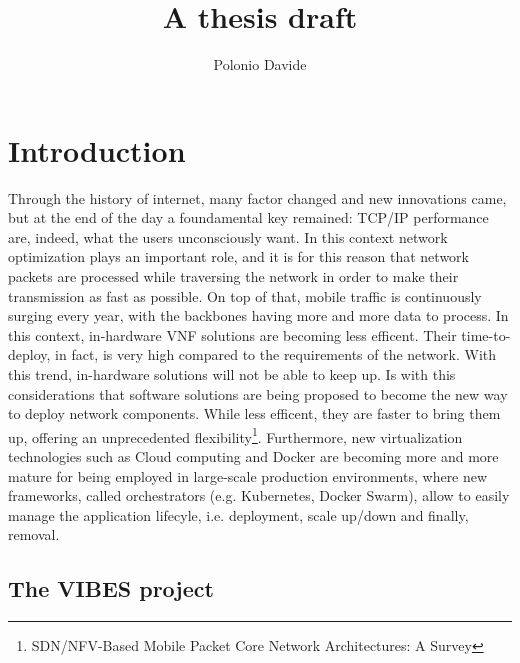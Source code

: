 \documentclass[10pt]{book}
\author{Polonio Davide}
\title{A thesis draft}
\begin{document}
 \maketitle
 

 
\chapter{Introduction}
\label{chap:intro}

 Through the history of internet, many factor changed and new innovations came,
but at the end of the day a foundamental key remained: TCP/IP performance are, 
indeed, what the users unconsciously want. In this context network optimization plays an 
important role, and it is for this reason that network packets are processed 
while traversing the network in order to make their transmission as fast as 
possible. On top of that, mobile traffic is continuously surging every year, 
with the backbones having more and more data to process. In this context, 
in-hardware VNF solutions are becoming less efficent. Their time-to-deploy, in 
fact, is very high compared to the requirements of the network. With this 
trend, in-hardware solutions will not be able to keep up. Is with this 
considerations that software solutions are being proposed to become the new way 
to deploy network components. While less efficent, they are faster to bring them 
up, offering an unprecedented flexibility\footnote{SDN/NFV-Based Mobile Packet 
Core Network Architectures: A Survey}. Furthermore, new virtualization 
technologies such as Cloud computing and Docker are becoming more and more 
mature for being employed in large-scale production environments, where new 
frameworks, called orchestrators (e.g. Kubernetes, Docker Swarm), allow to 
easily manage the application lifecyle, i.e. deployment, scale up/down
and finally, removal.

\section{The VIBES project}
 
\end{document}
